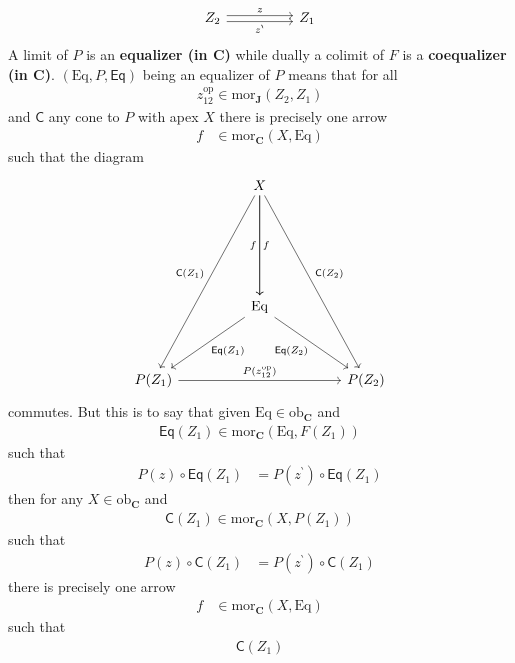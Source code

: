 \begin{exa}
\begin{enumerate}
\[
\begin{tikzcd}[sep=huge]
  Z_{2}
  \arrow[shift left=0.5ex]{r}{z}
  \arrow[swap,shift right=0.5ex]{r}{z^{\backprime}}
  &
  Z_{1}
\end{tikzcd}
\]
A limit of $P$ is an \textbf{equalizer (in $\mathbf{C}$)} while dually a colimit of $F$ is a \textbf{coequalizer (in $\mathbf{C}$)}. $(\mathrm{Eq},P,\mathsf{Eq})$ being an equalizer of $P$ means that for all
\begin{align*}
  z_{12}^{\mathrm{op}}
  \in
  \mathrm{mor}_{\mathbf{J}}(Z_{2},Z_{1})
\end{align*}
and $\mathsf{C}$ any cone to $P$ with apex $X$ there is precisely one arrow
\begin{align*}
  f
  &\in
  \mathrm{mor}_{\mathbf{C}}(X,\mathrm{Eq})
\end{align*}
such that the diagram
\[
\begin{tikzcd}[sep=huge]
  &
  X
  \arrow{dddr}{\mathsf{C}(Z_{2})}
  \arrow{dd}{f}
  \arrow[swap]{dd}{f}
  \arrow[swap]{dddl}{\mathsf{C}(Z_{1})}
  &
  \\
  &
  &
  \\
  &
  \mathrm{Eq}
  \arrow[swap]{dr}{\mathsf{Eq}(Z_{2})}
  \arrow{dl}{\mathsf{Eq}(Z_{1})}
  &
  \\
  P(Z_{1})
  \arrow{rr}{P(z_{12}^{\mathrm{op}})}
  &
  &
  P(Z_{2})
\end{tikzcd}
\]
commutes. But this is to say that given $\mathrm{Eq} \in \mathrm{ob}_{\mathbf{C}}$ and
\begin{align*}
  \mathsf{Eq}(Z_{1})
  \in
  \mathrm{mor}_{\mathbf{C}}(\mathrm{Eq},F(Z_{1}))
\end{align*}
such that
\begin{align*}
  P(z)
  \circ
  \mathsf{Eq}(Z_{1})
  &=
  P(z^{\backprime})
  \circ
  \mathsf{Eq}(Z_{1})
\end{align*}
then for any $X \in \mathrm{ob}_{\mathbf{C}}$ and
\begin{align*}
  \mathsf{C}(Z_{1})
  \in
  \mathrm{mor}_{\mathbf{C}}(X,P(Z_{1}))
\end{align*}
such that
\begin{align*}
  P(z)
  \circ
  \mathsf{C}(Z_{1})
  &=
  P(z^{\backprime})
  \circ
  \mathsf{C}(Z_{1})
\end{align*}
there is precisely one arrow
\begin{align*}
  f
  &\in
  \mathrm{mor}_{\mathbf{C}}(X,\mathrm{Eq})
\end{align*}
such that
\begin{align*}
  \mathsf{C}(Z_{1})

\end{align*}
\end{enumerate}
\end{exa}
